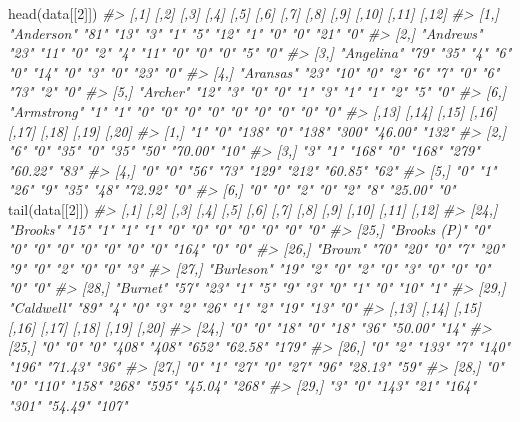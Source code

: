 \documentclass[
  12pt,
]{book}
\newenvironment{Shaded}{\begin{snugshade}}{\end{snugshade}}
\newcommand{\CommentTok}[1]{\textcolor[rgb]{0.37,0.37,0.37}{\textit{#1}}}
\newcommand{\DecValTok}[1]{\textcolor[rgb]{0.06,0.06,0.06}{#1}}
\newcommand{\FunctionTok}[1]{\textcolor[rgb]{0,0,0}{#1}}
\newcommand{\NormalTok}[1]{#1}
\begin{document}
\begin{Shaded}
\begin{Highlighting}[]
\FunctionTok{head}\NormalTok{(data[[}\DecValTok{2}\NormalTok{]])}
\CommentTok{\#\textgreater{}      [,1]        [,2] [,3] [,4] [,5] [,6] [,7] [,8] [,9] [,10] [,11] [,12]}
\CommentTok{\#\textgreater{} [1,] "Anderson"  "81" "13" "3"  "1"  "5"  "12" "1"  "0"  "0"   "21"  "0"  }
\CommentTok{\#\textgreater{} [2,] "Andrews"   "23" "11" "0"  "2"  "4"  "11" "0"  "0"  "0"   "5"   "0"  }
\CommentTok{\#\textgreater{} [3,] "Angelina"  "79" "35" "4"  "6"  "0"  "14" "0"  "3"  "0"   "23"  "0"  }
\CommentTok{\#\textgreater{} [4,] "Aransas"   "23" "10" "0"  "2"  "6"  "7"  "0"  "6"  "73"  "2"   "0"  }
\CommentTok{\#\textgreater{} [5,] "Archer"    "12" "3"  "0"  "0"  "1"  "3"  "1"  "1"  "2"   "5"   "0"  }
\CommentTok{\#\textgreater{} [6,] "Armstrong" "1"  "1"  "0"  "0"  "0"  "0"  "0"  "0"  "0"   "0"   "0"  }
\CommentTok{\#\textgreater{}      [,13] [,14] [,15] [,16] [,17] [,18] [,19]   [,20]}
\CommentTok{\#\textgreater{} [1,] "1"   "0"   "138" "0"   "138" "300" "46.00" "132"}
\CommentTok{\#\textgreater{} [2,] "6"   "0"   "35"  "0"   "35"  "50"  "70.00" "10" }
\CommentTok{\#\textgreater{} [3,] "3"   "1"   "168" "0"   "168" "279" "60.22" "83" }
\CommentTok{\#\textgreater{} [4,] "0"   "0"   "56"  "73"  "129" "212" "60.85" "62" }
\CommentTok{\#\textgreater{} [5,] "0"   "1"   "26"  "9"   "35"  "48"  "72.92" "0"  }
\CommentTok{\#\textgreater{} [6,] "0"   "0"   "2"   "0"   "2"   "8"   "25.00" "0"}
\FunctionTok{tail}\NormalTok{(data[[}\DecValTok{2}\NormalTok{]])}
\CommentTok{\#\textgreater{}       [,1]         [,2] [,3] [,4] [,5] [,6] [,7] [,8] [,9] [,10] [,11] [,12]}
\CommentTok{\#\textgreater{} [24,] "Brooks"     "15" "1"  "1"  "1"  "0"  "0"  "0"  "0"  "0"   "0"   "0"  }
\CommentTok{\#\textgreater{} [25,] "Brooks (P)" "0"  "0"  "0"  "0"  "0"  "0"  "0"  "0"  "164" "0"   "0"  }
\CommentTok{\#\textgreater{} [26,] "Brown"      "70" "20" "0"  "7"  "20" "9"  "0"  "2"  "0"   "0"   "3"  }
\CommentTok{\#\textgreater{} [27,] "Burleson"   "19" "2"  "0"  "2"  "0"  "3"  "0"  "0"  "0"   "0"   "0"  }
\CommentTok{\#\textgreater{} [28,] "Burnet"     "57" "23" "1"  "5"  "9"  "3"  "0"  "1"  "0"   "10"  "1"  }
\CommentTok{\#\textgreater{} [29,] "Caldwell"   "89" "4"  "0"  "3"  "2"  "26" "1"  "2"  "19"  "13"  "0"  }
\CommentTok{\#\textgreater{}       [,13] [,14] [,15] [,16] [,17] [,18] [,19]   [,20]}
\CommentTok{\#\textgreater{} [24,] "0"   "0"   "18"  "0"   "18"  "36"  "50.00" "14" }
\CommentTok{\#\textgreater{} [25,] "0"   "0"   "0"   "408" "408" "652" "62.58" "179"}
\CommentTok{\#\textgreater{} [26,] "0"   "2"   "133" "7"   "140" "196" "71.43" "36" }
\CommentTok{\#\textgreater{} [27,] "0"   "1"   "27"  "0"   "27"  "96"  "28.13" "59" }
\CommentTok{\#\textgreater{} [28,] "0"   "0"   "110" "158" "268" "595" "45.04" "268"}
\CommentTok{\#\textgreater{} [29,] "3"   "0"   "143" "21"  "164" "301" "54.49" "107"}
\end{Highlighting}
\end{Shaded}
\end{document}
